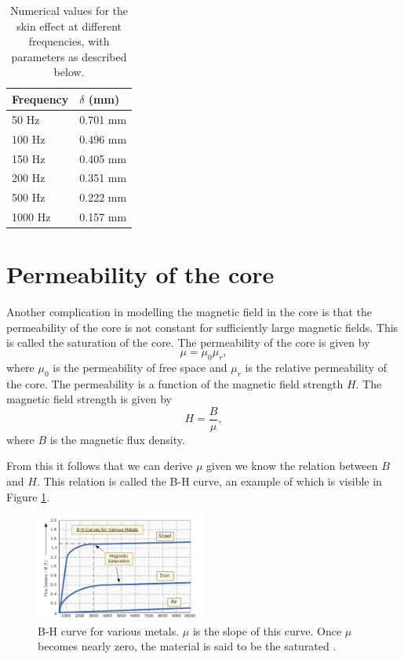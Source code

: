 \begin{table}
    \centering
    \begin{tabular}{l|l}
        Frequency & $\delta$ (mm) \\
        \hline
        50 Hz   & 0.701 mm \\
        100 Hz  & 0.496 mm \\
        150 Hz  & 0.405 mm \\
        200 Hz  & 0.351 mm \\
        500 Hz  & 0.222 mm \\
        1000 Hz & 0.157 mm \\
    \end{tabular}
    \caption{Numerical values for the skin effect at different frequencies, with parameters as described below.}
    \label{tab:skin_effect}
\end{table}


\section{Permeability of the core}
Another complication in modelling the magnetic field in the core is that the permeability of the core is not constant for sufficiently large magnetic fields.
This is called the saturation of the core. The permeability of the core is given by
\begin{equation}
    \mu = \mu_0 \mu_r,
\end{equation}
where $\mu_0$ is the permeability of free space and $\mu_r$ is the relative permeability of the core. The permeability is a function of the magnetic field strength $H$.
The magnetic field strength is given by
\begin{equation}
    H = \frac{B}{\mu},
\end{equation}
where $B$ is the magnetic flux density. 

From this it follows that we can derive $\mu$ given we know the relation between $B$ and $H$. 
This relation is called the B-H curve, an example of which is visible in Figure \ref{fig:bhcurve}.
\begin{figure}[H]
    \centering
    \includegraphics[width=0.5\textwidth]{img/BH_curve.png}
    \caption{B-H curve for various metals. $\mu$ is the slope of this curve. Once $\mu$ becomes nearly zero, the material is said 
    to be the saturated \cite{bhcurve}.}
    \label{fig:bhcurve}
\end{figure}

